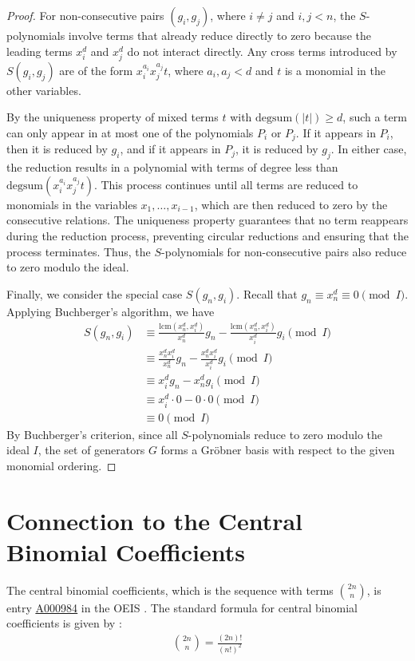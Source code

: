 \documentclass[12pt,reqno]{article}
\theoremstyle{plain}
\newcommand{\lcm}{\mathrm{lcm}}
\newcommand{\degsum}{\mathrm{degsum}}
\newcommand{\seqnum}[1]{\href{https://oeis.org/#1}{\rm \underline{#1}}}
\begin{document}
\begin{proof}
For non-consecutive pairs $(g_i, g_j)$, where $i \neq j$ and $i,j < n$, the $S$-polynomials involve terms that already reduce directly to zero because the leading terms $x_i^d$ and $x_j^d$ do not interact directly. Any cross terms introduced by $S(g_i, g_j)$ are of the form $x_i^{a_i} x_j^{a_j} t$, where $a_i, a_j < d$ and $t$ is a monomial in the other variables.

By the uniqueness property of mixed terms $t$ with $\degsum(|t|) \geq d$, such a term can only appear in at most one of the polynomials $P_i$ or $P_j$. If it appears in $P_i$, then it is reduced by $g_i$, and if it appears in $P_j$, it is reduced by $g_j$. In either case, the reduction results in a polynomial with terms of degree less than $\degsum(x_i^{a_i} x_j^{a_j} t)$. This process continues until all terms are reduced to monomials in the variables $x_1, \ldots, x_{i-1}$, which are then reduced to zero by the consecutive relations. The uniqueness property guarantees that no term reappears during the reduction process, preventing circular reductions and ensuring that the process terminates. Thus, the $S$-polynomials for non-consecutive pairs also reduce to zero modulo the ideal.

Finally, we consider the special case $S(g_n,g_i)$. Recall that $g_n \equiv x_n^d \equiv 0 \pmod{I}$. Applying Buchberger's algorithm, we have
\begin{align*}
S(g_n, g_i) &\equiv \frac{\lcm(x_n^d, x_i^d)}{x_n^d} g_n
- \frac{\lcm(x_n^d, x_i^d)}{x_i^d} g_i \pmod{I} \\
&\equiv \frac{x_n^d x_i^d}{x_n^d} g_n - \frac{x_n^d x_i^d}{x_i^d} g_i \pmod{I} \\
&\equiv x_i^d g_n - x_n^d g_i \pmod{I} \\
&\equiv x_i^d \cdot 0 - 0 \cdot 0 \pmod{I} \\
&\equiv 0 \pmod{I}
\end{align*}
By Buchberger's criterion, since all $S$-polynomials reduce to zero modulo the ideal $I$, the set of generators $G$ forms a Gröbner basis with respect to the given monomial ordering.
\end{proof}

\section{Connection to the Central Binomial Coefficients} \label{section:cbc}
The central binomial coefficients, which is the sequence with terms $\binom{2n}{n}$, is entry \seqnum{A000984} in the OEIS \cite{A000984}. The standard formula for central binomial coefficients is given by \cite{A000984}:
\begin{align*}
    \binom{2n}{n} = \frac{(2n)!}{(n!)^2} 
\end{align*}
\end{document}
